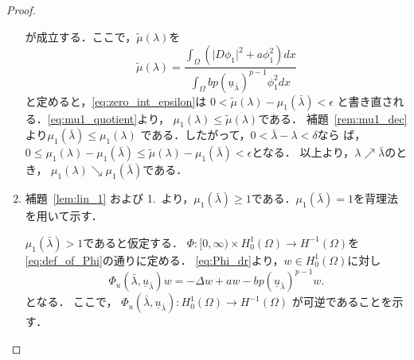 \begin{proof}
\begin{enumerate}[1.]
        が成立する．ここで，$\tilde{\mu}(\lambda)$を
        \[
         \tilde{\mu}(\lambda) = 
        \frac{\displaystyle \int_\Omega \left( \lvert D\phi_1
                                              \rvert^2
                                              + a
                                             \phi_1^2\right) dx}
         {\displaystyle 
         \int_\Omega bp (\underline{u}_{\bar{\lambda}})^{p-1} \phi_1^2 dx}
        \]
        と定めると，\eqref{eq:zero_int_epsilon}は
        $0 < \tilde{\mu}(\lambda) - \mu_1(\bar{\lambda}) < \epsilon$
        と書き直される．\eqref{eq:mu1_quotient}より，
        $\mu_1(\lambda) \leq \tilde{\mu}(\lambda)$である．
        補題~\ref{rem:mu1_dec}より$\mu_1(\bar{\lambda}) \leq
        \mu_1(\lambda)$
        である．したがって，$0 < \bar{\lambda} - \lambda < \delta$なら
        ば，$0 \leq \mu_1 (\lambda) - \mu_1 (\bar{\lambda}) \leq
        \tilde{\mu}(\lambda) - \mu_1 (\bar{\lambda}) < \epsilon$となる．
        以上より，$\lambda \nearrow \bar{\lambda}$のとき，
        $\mu_1(\lambda) \searrow \mu_1(\bar{\lambda})$である．
  \item 補題~\ref{lem:lin_1} および 1.~より，$\mu_1(\bar{\lambda})
        \geq 1$である．$\mu_1(\bar{\lambda}) = 1$を背理法を用いて示す．
        
        $\mu_1(\bar{\lambda}) > 1$であると仮定する．
        $\Phi \colon [0,\infty) \times H^1_0 (\Omega) \to
        H^{-1}(\Omega)$を
        \eqref{eq:def_of_Phi}の通りに定める．
        \eqref{eq:Phi_dr}より，$w \in H^1_0(\Omega)$に対し
        \begin{equation}
         \Phi_u (\bar{\lambda}, \underline{u}_{\bar{\lambda}})
          w = -\Delta w + aw - b
          p(\underline{u}_{\bar{\lambda}})^{p-1} w.
          \label{eq:Phi_dr_barlambda}
        \end{equation}
        となる．
        ここで，
        $\Phi_u (\bar{\lambda}, \underline{u}_{\bar{\lambda}}) \colon
        H_0^1(\Omega) \to H^{-1}(\Omega)$
        が可逆であることを示す．


\end{enumerate}
\end{proof}
